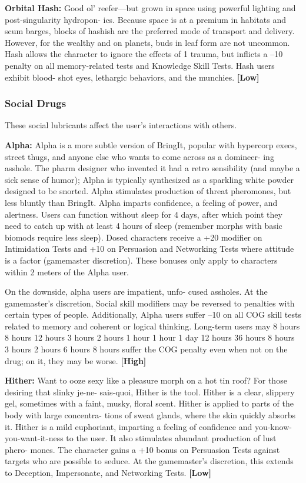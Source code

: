 \textbf{Orbital Hash:} Good ol' reefer—but grown in space 
using powerful lighting and post-singularity hydropon-
ics. Because space is at a premium in habitats and scum 
barges, blocks of hashish are the preferred mode of 
transport and delivery. However, for the wealthy and 
on planets, buds in leaf form are not uncommon. Hash 
allows the character to ignore the effects of 1 trauma, 
but inflicts a –10 penalty on all memory-related tests 
and Knowledge Skill Tests. Hash users exhibit blood-
shot eyes, lethargic behaviors, and the munchies. \textbf{[Low]}

\subsubsection{Social Drugs}

These social lubricants affect the user's interactions 
with others.

\textbf{Alpha:} Alpha is a more subtle version of BringIt, 
popular with hypercorp execs, street thugs, and 
anyone else who wants to come across as a domineer-
ing asshole. The pharm designer who invented it had 
a retro sensibility (and maybe a sick sense of humor); 
Alpha is typically synthesized as a sparkling white 
powder designed to be snorted. Alpha stimulates 
production of threat pheromones, but less bluntly 
than BringIt. Alpha imparts confidence, a feeling of 
power, and alertness. Users can function without sleep 
for 4 days, after which point they need to catch up 
with at least 4 hours of sleep (remember morphs with 
basic biomods require less sleep). Dosed characters 
receive a +20 modifier on Intimidation Tests and +10 
on Persuasion and Networking Tests where attitude is 
a factor (gamemaster discretion). These bonuses only 
apply to characters within 2 meters of the Alpha user.

On the downside, alpha users are impatient, unfo-
cused assholes. At the gamemaster's discretion, Social 
skill modifiers may be reversed to penalties with 
certain types of people. Additionally, Alpha users 
suffer –10 on all COG skill tests related to memory 
and coherent or logical thinking. Long-term users may 
8 hours
8 hours
12 hours
3 hours
2 hours
1 hour
1 hour
1 day
12 hours
36 hours
8 hours
3 hours
2 hours
6 hours
8 hours
suffer the COG penalty even when not on the drug; 
on it, they may be worse. \textbf{[High]}

\textbf{Hither:} Want to ooze sexy like a pleasure morph 
on a hot tin roof? For those desiring that slinky je-ne-
sais-quoi, Hither is the tool. Hither is a clear, slippery 
gel, sometimes with a faint, musky, floral scent. Hither 
is applied to parts of the body with large concentra-
tions of sweat glands, where the skin quickly absorbs 
it. Hither is a mild euphoriant, imparting a feeling of 
confidence and you-know-you-want-it-ness to the user. 
It also stimulates abundant production of lust phero-
mones. The character gains a +10 bonus on Persuasion 
Tests against targets who are possible to seduce. At the 
gamemaster's discretion, this extends to Deception, 
Impersonate, and Networking Tests. \textbf{[Low]}

